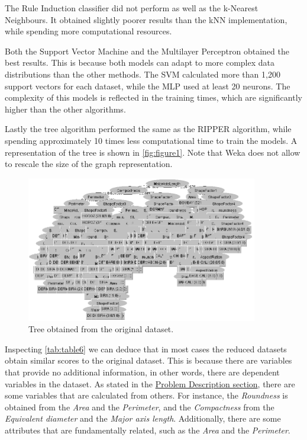 \documentclass[a4paper,11pt]{article}
\begin{document}
The Rule Induction classifier did not perform as well as the k-Nearest Neighbours. It obtained slightly poorer results than the kNN implementation, while spending more computational resources.

Both the Support Vector Machine and the Multilayer Perceptron obtained the best results. This is because both models can adapt to more complex data distributions than the other methods. The SVM calculated more than 1,200 support vectors for each dataset, while the MLP used at least 20 neurons. The complexity of this models is reflected in the training times, which are significantly higher than the other algorithms.

Lastly the tree algorithm performed the same as the RIPPER algorithm, while spending approximately 10 times less computational time to train the models. A representation of the tree is shown in \autoref{fig:figure1}. Note that Weka does not allow to rescale the size of the graph representation.

\begin{figure}[h]
\centering
\includegraphics[width=0.9\textwidth]{tree}
\caption{Tree obtained from the original dataset.}
\label{fig:figure1}
\end{figure}

Inspecting \autoref{tab:table6} we can deduce that in most cases the reduced datasets obtain similar scores to the original dataset. This is because there are variables that provide no additional information, in other words, there are dependent variables in the dataset. As stated in the \hyperref[sec:problem]{Problem Description section}, there are some variables that are calculated from others. For instance, the \textit{Roundness} is obtained from the \textit{Area} and the \textit{Perimeter}, and the \textit{Compactness} from the \textit{Equivalent diameter} and the \textit{Major axis length}. Additionally, there are some attributes that are fundamentally related, such as the \textit{Area} and the \textit{Perimeter}.
\end{document}

